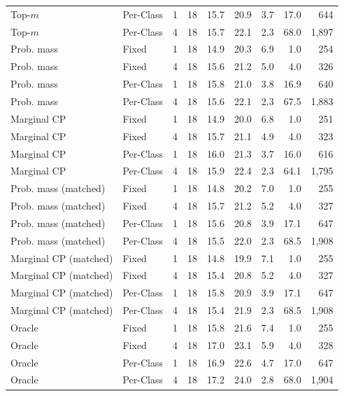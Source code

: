\begin{tabular}{llrrrrrrr}
Top-$m$ & Per-Class & 1 & 18 & 15.7 & 20.9 & 3.7 & 17.0 & 644 \\
Top-$m$ & Per-Class & 4 & 18 & 15.7 & 22.1 & 2.3 & 68.0 & 1,897 \\
Prob. mass & Fixed & 1 & 18 & 14.9 & 20.3 & 6.9 & 1.0 & 254 \\
Prob. mass & Fixed & 4 & 18 & 15.6 & 21.2 & 5.0 & 4.0 & 326 \\
Prob. mass & Per-Class & 1 & 18 & 15.8 & 21.0 & 3.8 & 16.9 & 640 \\
Prob. mass & Per-Class & 4 & 18 & 15.6 & 22.1 & 2.3 & 67.5 & 1,883 \\
Marginal CP & Fixed & 1 & 18 & 14.9 & 20.0 & 6.8 & 1.0 & 251 \\
Marginal CP & Fixed & 4 & 18 & 15.7 & 21.1 & 4.9 & 4.0 & 323 \\
Marginal CP & Per-Class & 1 & 18 & 16.0 & 21.3 & 3.7 & 16.0 & 616 \\
Marginal CP & Per-Class & 4 & 18 & 15.9 & 22.4 & 2.3 & 64.1 & 1,795 \\
Prob. mass (matched) & Fixed & 1 & 18 & 14.8 & 20.2 & 7.0 & 1.0 & 255 \\
Prob. mass (matched) & Fixed & 4 & 18 & 15.7 & 21.2 & 5.2 & 4.0 & 327 \\
Prob. mass (matched) & Per-Class & 1 & 18 & 15.6 & 20.8 & 3.9 & 17.1 & 647 \\
Prob. mass (matched) & Per-Class & 4 & 18 & 15.5 & 22.0 & 2.3 & 68.5 & 1,908 \\
Marginal CP (matched) & Fixed & 1 & 18 & 14.8 & 19.9 & 7.1 & 1.0 & 255 \\
Marginal CP (matched) & Fixed & 4 & 18 & 15.4 & 20.8 & 5.2 & 4.0 & 327 \\
Marginal CP (matched) & Per-Class & 1 & 18 & 15.8 & 20.9 & 3.9 & 17.1 & 647 \\
Marginal CP (matched) & Per-Class & 4 & 18 & 15.4 & 21.9 & 2.3 & 68.5 & 1,908 \\
Oracle & Fixed & 1 & 18 & 15.8 & 21.6 & 7.4 & 1.0 & 255 \\
Oracle & Fixed & 4 & 18 & 17.0 & 23.1 & 5.9 & 4.0 & 328 \\
Oracle & Per-Class & 1 & 18 & 16.9 & 22.6 & 4.7 & 17.0 & 647 \\
Oracle & Per-Class & 4 & 18 & 17.2 & 24.0 & 2.8 & 68.0 & 1,904 \\
\bottomrule
\end{tabular}
